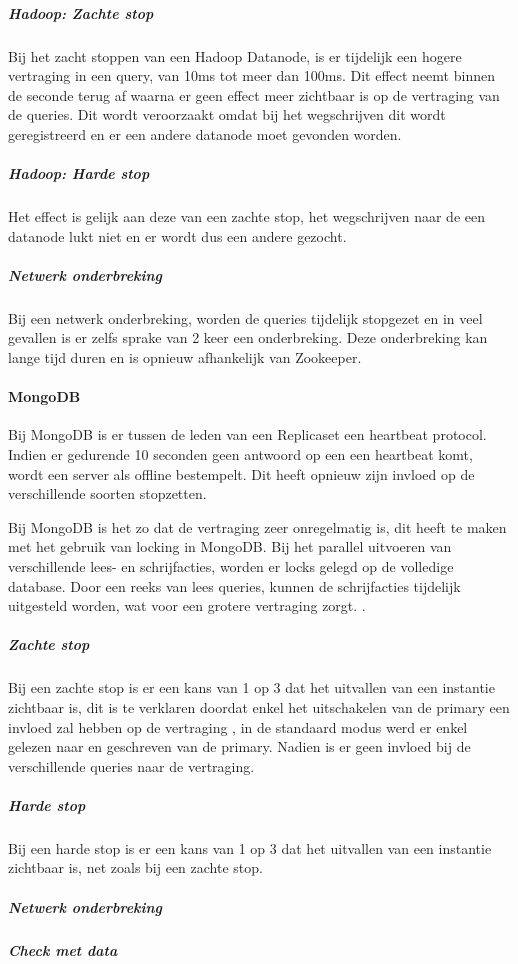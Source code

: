 \subparagraph{Hadoop: Zachte stop} Bij het zacht stoppen van een Hadoop Datanode, is er tijdelijk een hogere vertraging in een query, van 10ms tot meer dan 100ms. Dit effect neemt binnen de seconde terug af waarna er geen effect meer zichtbaar is op de vertraging van de queries. Dit wordt veroorzaakt omdat bij het wegschrijven dit wordt geregistreerd en er een andere datanode moet gevonden worden. 

\subparagraph{Hadoop: Harde stop} Het effect is gelijk aan deze van een zachte stop, het wegschrijven naar de een datanode lukt niet en er wordt dus een andere gezocht. 

\subparagraph{Netwerk onderbreking} Bij een netwerk onderbreking, worden de queries tijdelijk stopgezet en in veel gevallen is er zelfs sprake van 2 keer een onderbreking. Deze onderbreking kan lange tijd duren en is opnieuw afhankelijk van Zookeeper. 

\paragraph{MongoDB} Bij MongoDB is er tussen de leden van een Replicaset een heartbeat protocol. Indien er gedurende 10 seconden geen antwoord op een een heartbeat komt, wordt een server als offline bestempelt. Dit heeft opnieuw zijn invloed op de verschillende soorten stopzetten. 

Bij MongoDB is het zo dat de vertraging zeer onregelmatig is, dit heeft te maken met het gebruik van locking in MongoDB. Bij het parallel uitvoeren van verschillende lees- en schrijfacties, worden er locks gelegd op de volledige database. Door een reeks van lees queries, kunnen de schrijfacties tijdelijk uitgesteld worden, wat voor een grotere vertraging zorgt. \cite{mongodb-concurrency}. 

\subparagraph{Zachte stop} Bij een zachte stop is er een kans van 1 op 3 dat het uitvallen van een instantie zichtbaar is, dit is te verklaren doordat enkel het uitschakelen van de primary een invloed zal hebben op de vertraging , in de standaard modus werd er enkel gelezen naar en geschreven van de primary. Nadien is er geen invloed bij de verschillende queries naar de vertraging. 

\subparagraph{Harde stop} Bij een harde stop is er een kans van 1 op 3 dat het uitvallen van een instantie zichtbaar is, net zoals bij een zachte stop. 

\subparagraph{Netwerk onderbreking}\subparagraph{Check met data}

